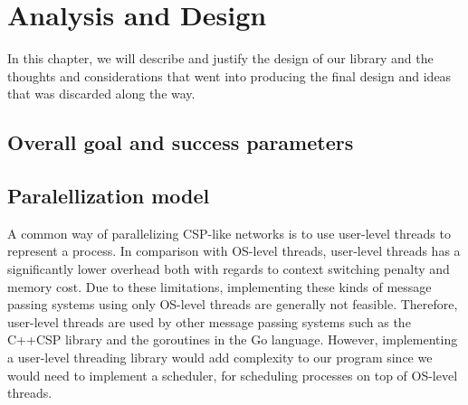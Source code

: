 \chapter{Analysis and Design}
In this chapter, we will describe and justify the design of our
library and the thoughts and considerations that went into producing
the final design and ideas that was discarded along the way.

\section{Overall goal and success parameters}





\section{Paralellization model}
A common way of parallelizing CSP-like networks is to use user-level
threads to represent a process. In comparison with OS-level threads,
user-level threads has a significantly lower overhead both with
regards to context switching penalty \cite{sung2002comparative} and
memory cost. Due to these limitations, implementing these kinds of
message passing systems using only OS-level threads are generally not
feasible. Therefore, user-level threads are used by other message
passing systems such as the C++CSP library\cite{brown2003introduction}
and the goroutines in the Go
language\cite{deshpandeanalysis}. However, implementing a user-level
threading library would add complexity to our program since we would
need to implement a scheduler, for scheduling processes on top of
OS-level threads.

